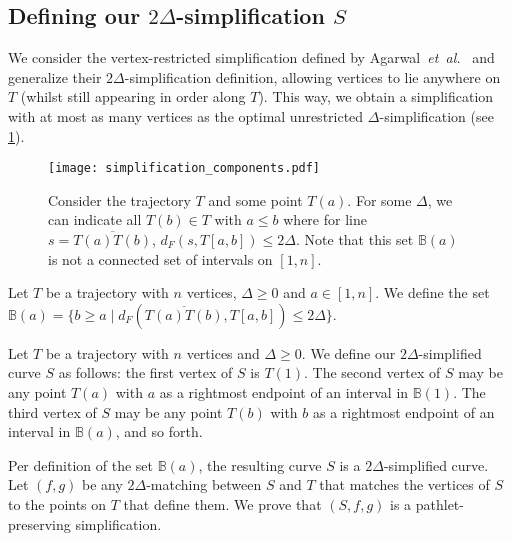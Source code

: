\documentclass[a4paper,UKenglish,cleveref,thm-restate,notab]{lipics-v2021}
\makeatletter
\newcommand{\etal}{\textit{et~al.\@}\xspace}
\newcommand{\dF}{\ensuremath{d_F}}
\newcommand{\B}{\mathbb{B}}
\makeatother
\begin{document}
\subsection{Defining our \texorpdfstring{$2\Delta$}{2Δ}-simplification \texorpdfstring{$S$}{S}}
\label{appsub:greedy_simplification}
        
    We consider the vertex-restricted simplification defined by Agarwal~\etal~\cite{agarwal_near-linear_2005} and generalize their $2\Delta$-simplification definition, allowing vertices to lie anywhere on $T$ (whilst still appearing in order along $T$).
    This way, we obtain a simplification with at most as many vertices as the optimal unrestricted $\Delta$-simplification (see \cref{fig:simplification_components}).
        
    \begin{figure}
        \centering
        \texttt{[image: simplification\_components.pdf]}
        \caption{Consider the trajectory $T$ and some point $T(a)$. For some $\Delta$, we can indicate all $T(b) \in T$ with $a \leq b$ where for line $s = \overline{T(a)T(b)}$, $\dF(s, T[a, b]) \leq 2 \Delta$. Note that this set $\B(a)$ is not a connected set of intervals on $[1, n]$.}
        \label{fig:simplification_components}
    \end{figure}
        
    \begin{definition}
    \label{def:baset}
        Let $T$ be a trajectory with $n$ vertices, $\Delta \geq 0$ and $a \in [1, n]$. 
        We define the set $\B(a) = \{ b \geq a \mid \dF(\overline{T(a) T(b)}, T[a, b]) \leq 2\Delta \}$. 
    \end{definition}
        
    \begin{definition}
    \label{def:curve_S}
        Let $T$ be a trajectory with $n$ vertices and $\Delta \geq 0$.
        We define our $2\Delta$-simplified curve $S$ as follows: the first vertex of $S$ is $T(1)$. 
        The second vertex of $S$ may be any point $T(a)$ with $a$ as a rightmost endpoint of an interval in $\B(1)$.
        The third vertex of $S$ may be any point $T(b)$ with $b$ as a rightmost endpoint of an interval in $\B(a)$, and so forth. 
    \end{definition}
 
    Per definition of the set $\B(a)$, the resulting curve $S$ is a $2\Delta$-simplified curve.
    Let $(f, g)$ be any $2\Delta$-matching between $S$ and $T$ that matches the vertices of $S$ to the points on $T$ that define them.
    We prove that $(S, f, g)$ is a pathlet-preserving simplification.
    
\end{document}
